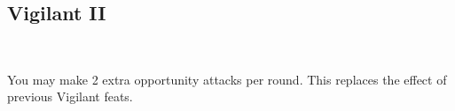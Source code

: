 \subsection*{Vigilant II}\label{feat:vigilant2}
 \\

You may make 2 extra opportunity attacks per round. This replaces the effect
of previous Vigilant feats.
